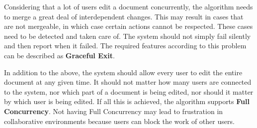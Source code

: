 Considering that a lot of users edit a document concurrently, the algorithm needs to merge a great deal of interdependent changes. This may result in cases that are not mergeable, in which case certain actions cannot be respected. These cases need to be detected and taken care of. The system should not simply fail silently and then report when it failed. The required features according to this problem can be described as \textbf{Graceful Exit}.

In addition to the above, the system should allow every user to edit the entire document at any given time. It should not matter how many users are connected to the system, nor which part of a document is being edited, nor should it matter by which user is being edited. If all this is achieved, the algorithm supports \textbf{Full Concurrency}. Not having Full Concurrency may lead to frustration in collaborative environments because users can block the work of other users.